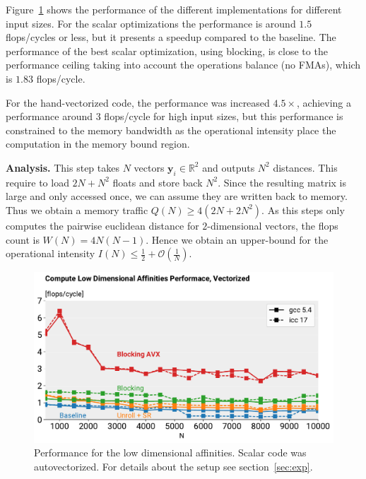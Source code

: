 \documentclass[letterpaper]{article}
\newcommand{\mypar}[1]{{\bf #1.}}
\begin{document}
Figure~\ref{fig:bench:ld_affinities} shows the performance of the different implementations for different input sizes. For the scalar optimizations the performance is around $1.5$ flops/cycles or less, but it presents a speedup compared to the baseline. The performance of the best scalar optimization, using blocking, is close to the performance ceiling taking into account the operations balance (no FMAs), which is $1.83$ flops/cycle.

For the hand-vectorized code, the performance was increased $4.5 \times$, achieving a performance around 3 flops/cycle for high input sizes, but this performance is constrained to the memory bandwidth as the operational intensity place the computation in the memory bound region.

\mypar{Analysis} This step takes $N$ vectors $\mathbf{y}_i \in \mathbb{R}^2$ and outputs $N^2$ distances. This require to load $2N+N^2$ floats and store back $N^2$. Since the resulting matrix is large and only accessed once, we can assume they are written back to memory. Thus we obtain a memory traffic $Q(N) \geq 4(2N + 2N^2)$. As this steps only computes the pairwise euclidean distance for $2$-dimensional vectors, the flops count is $W(N) = 4N(N-1)$. Hence we obtain an upper-bound for the operational intensity $I(N) \leq \frac{1}{2} + \mathcal{O}(\frac{1}{N})$.

\begin{figure}[h]
  \includegraphics[width=\linewidth]{images/ld_affinities_vec}
  \caption{Performance for the low dimensional affinities. Scalar code was autovectorized. For details about the setup see section~\ref{sec:exp}.}
   \label{fig:bench:ld_affinities}
   \vspace{-5mm}
\end{figure}
\end{document}
